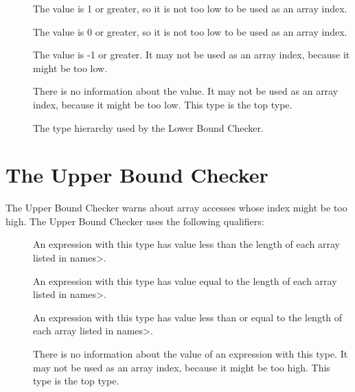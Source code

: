 \begin{description}
\item[]
  The value is 1 or greater, so it is not too low to be used as an array index.
\item[]
  The value is 0 or greater, so it is not too low to be used as an array index.
\item[]
  The value is -1 or greater.
  It may not be used as an array index, because it might be too low.
\item[]
  There is no information about the value.
  It may not be used as an array index, because it might be too low.
  This type is the top type.
\end{description}

\begin{figure}
\caption{The type hierarchy used by the Lower Bound Checker.}
\label{fig-lowerbound-types}
\end{figure}


\section{The Upper Bound Checker\label{index-upperbound}}

The Upper Bound Checker warns about array accesses whose index might be
too high. The Upper Bound Checker uses the following
qualifiers:

\begin{description}
\item[]
  An expression with this type
  has value less than the length of each array listed in \<names>.
\item[]
  An expression with this type
  has value equal to the length of each array listed in \<names>.
\item[]
  An expression with this type
  has value less than or equal to the length of each array listed in \<names>.
\item[]
  There is no information about the value of an expression with this type.
  It may not be used as an array index, because it might be too high.
  This type is the top type.
\end{description}
